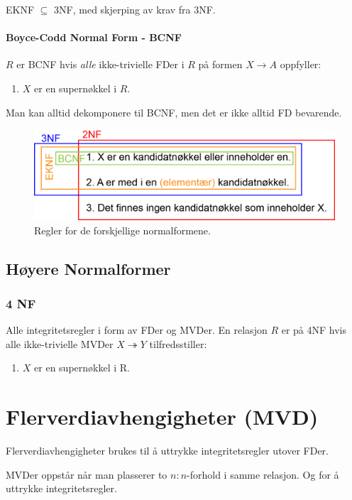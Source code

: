 \documentclass[12pt,a4paper]{article}
\begin{document}
EKNF $\subseteq$ 3NF, med skjerping av krav fra 3NF.

\paragraph{Boyce-Codd Normal Form - BCNF} $R$ er BCNF hvis \textit{alle} ikke-trivielle FDer i $R$ på formen $X \rightarrow A$ oppfyller:
\begin{enumerate}
\item{$X$ er en supernøkkel i $R$.}
\end{enumerate}

Man kan alltid dekomponere til BCNF, men det er ikke alltid FD bevarende.

\begin{figure}[h!]
	\centering
		\includegraphics[width=\linewidth]{img/nfr.png}
	\caption{Regler for de forskjellige normalformene.}
\end{figure}

\subsection{Høyere Normalformer}
\subsubsection{4 NF}
Alle integritetsregler i form av FDer og MVDer. En relasjon $R$ er på 4NF hvis alle ikke-trivielle MVDer $X \twoheadrightarrow Y$ tilfredsstiller:
\begin{enumerate}
\item{$X$ er en supernøkkel i R.}
\end{enumerate}

\section{Flerverdiavhengigheter (MVD)}
Flerverdiavhengigheter brukes til å uttrykke integritetsregler utover FDer. 

MVDer oppstår når man plasserer to $n:n$-forhold i samme relasjon. Og for å uttrykke integritetsregler.
\end{document}
